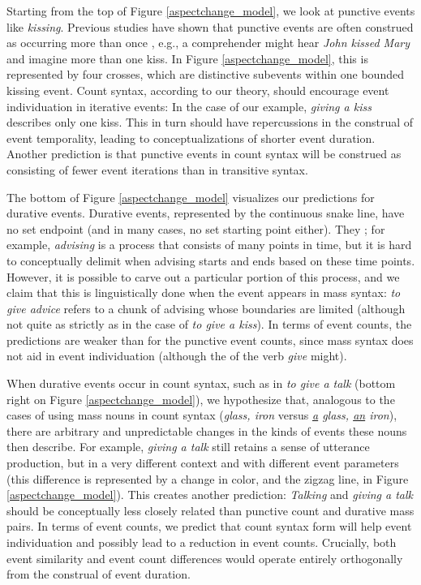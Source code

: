 \documentclass[preprint,12pt,authoryear]{elsarticle}
\begin{document}
Starting from the top of Figure \ref{aspectchange_model}, we look at punctive events like \emph{kissing}. Previous studies have shown that punctive events are often construed as occurring more than once \citep{paczynski2014events,barner2008events,Kim2015}, e.g., a comprehender might hear \emph{John kissed Mary} and imagine more than one kiss. In Figure \ref{aspectchange_model}, this is represented by four crosses, which are distinctive subevents within one bounded kissing event. Count syntax, according to our theory, should encourage event individuation in iterative events: In the case of our example, \emph{giving a kiss} describes only one  kiss. This in turn should have repercussions in the construal of event temporality, leading to conceptualizations of shorter event duration. Another prediction is that punctive events in count syntax will be construed as consisting of fewer event iterations than in transitive syntax. 

The bottom of Figure \ref{aspectchange_model} visualizes our predictions for durative events. Durative events, represented by the continuous snake line, have no set endpoint (and in many cases, no set starting point either). They ; for example, \emph{advising} is a process that consists of many points in time, but it is hard to conceptually delimit when advising starts and ends based on these time points. However, it is possible to carve out a particular portion of this process, and we claim that this is linguistically done when the event appears in mass syntax: \emph{to give advice} refers to a chunk of advising whose boundaries are limited (although not quite as strictly as in the case of \emph{to give a kiss}). In terms of event counts, the predictions are weaker than for the punctive event counts, since mass syntax does not aid in event individuation (although the  of the verb \emph{give} might).

When durative events occur in count syntax, such as in \emph{to give a talk} (bottom right on Figure \ref{aspectchange_model}), we hypothesize that, analogous to the cases of using mass nouns in count syntax (\emph{glass, iron} versus \emph{\underline{a} glass, \underline{an} iron}), there are arbitrary and unpredictable changes in the kinds of events these nouns then describe. For example, \emph{giving a talk} still retains a sense of utterance production, but in a very different context and with different event parameters (this difference is represented by a change in color, and the zigzag line, in Figure \ref{aspectchange_model}). This creates another prediction: \emph{Talking} and \emph{giving a talk} should be conceptually less closely related than punctive count and durative mass pairs. In terms of event counts, we predict that count syntax form will help event individuation and possibly lead to a reduction in event counts. Crucially, both event similarity and event count differences would operate entirely orthogonally from the construal of event duration.
\end{document}

